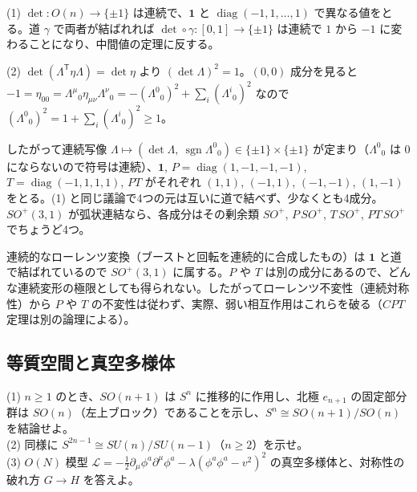 \begin{solution}
(1) $\det\colon O(n)\to\{\pm1\}$ は連続で、$\mathbf 1$ と $\operatorname{diag}(-1,1,\dots,1)$ で異なる値をとる。道 $\gamma$ で両者が結ばれれば $\det\circ\gamma\colon[0,1]\to\{\pm1\}$ は連続で $1$ から $-1$ に変わることになり、中間値の定理に反する。

(2) $\det(\Lambda^{\mathsf T}\eta\Lambda)=\det\eta$ より $(\det\Lambda)^2=1$。$(0,0)$ 成分を見ると $-1=\eta_{00}=\Lambda^\mu{}_0\eta_{\mu\nu}\Lambda^\nu{}_0=-(\Lambda^0{}_0)^2+\sum_i(\Lambda^i{}_0)^2$ なので $(\Lambda^0{}_0)^2=1+\sum_i(\Lambda^i{}_0)^2\ge1$。

したがって連続写像 $\Lambda\mapsto(\det\Lambda,\ \operatorname{sgn}\Lambda^0{}_0)\in\{\pm1\}\times\{\pm1\}$ が定まり（$\Lambda^0{}_0$ は $0$ にならないので符号は連続）、$\mathbf 1$, $P=\operatorname{diag}(1,-1,-1,-1)$, $T=\operatorname{diag}(-1,1,1,1)$, $PT$ がそれぞれ $(1,1)$, $(-1,1)$, $(-1,-1)$, $(1,-1)$ をとる。(1) と同じ議論で4つの元は互いに道で結べず、少なくとも4成分。$SO^+(3,1)$ が弧状連結なら、各成分はその剰余類 $SO^+$, $P\,SO^+$, $T\,SO^+$, $PT\,SO^+$ でちょうど4つ。

連続的なローレンツ変換（ブーストと回転を連続的に合成したもの）は $\mathbf 1$ と道で結ばれているので $SO^+(3,1)$ に属する。$P$ や $T$ は別の成分にあるので、どんな連続変形の極限としても得られない。したがってローレンツ不変性（連続対称性）から $P$ や $T$ の不変性は従わず、実際、弱い相互作用はこれらを破る（$CPT$ 定理は別の論理による）。
\end{solution}

\subsection{等質空間と真空多様体}

\begin{problem}[難易度 B]\label{ch01-prob-sphere}
(1) $n\ge1$ のとき、$SO(n+1)$ は $S^n$ に推移的に作用し、北極 $e_{n+1}$ の固定部分群は $SO(n)$（左上ブロック）であることを示し、$S^n\cong SO(n+1)/SO(n)$ を結論せよ。\\
(2) 同様に $S^{2n-1}\cong SU(n)/SU(n-1)$（$n\ge2$）を示せ。\\
(3) $O(N)$ 模型 $\mathcal L=-\tfrac12\partial_\mu\phi^a\partial^\mu\phi^a-\lambda(\phi^a\phi^a-v^2)^2$ の真空多様体と、対称性の破れ方 $G\to H$ を答えよ。
\end{problem}

